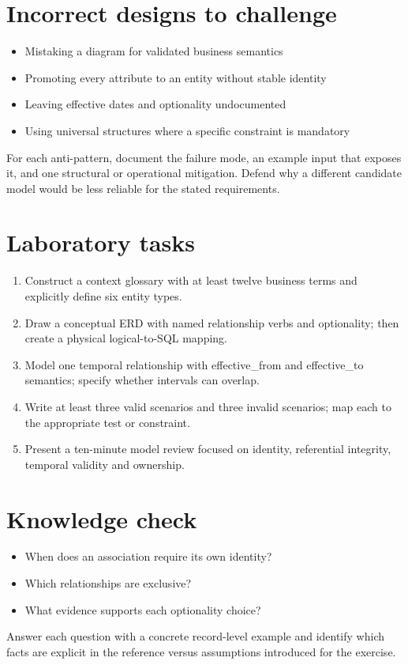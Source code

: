 \documentclass[11pt,letterpaper]{article}
\begin{document}
\section{Incorrect designs to challenge}
\begin{itemize}
\item Mistaking a diagram for validated business semantics
\item Promoting every attribute to an entity without stable identity
\item Leaving effective dates and optionality undocumented
\item Using universal structures where a specific constraint is mandatory
\end{itemize}
For each anti-pattern, document the failure mode, an example input that exposes it, and one structural or operational mitigation. Defend why a different candidate model would be less reliable for the stated requirements.


\section{Laboratory tasks}
\begin{enumerate}
\item Construct a context glossary with at least twelve business terms and explicitly define six entity types.
\item Draw a conceptual ERD with named relationship verbs and optionality; then create a physical logical-to-SQL mapping.
\item Model one temporal relationship with effective\_from and effective\_to semantics; specify whether intervals can overlap.
\item Write at least three valid scenarios and three invalid scenarios; map each to the appropriate test or constraint.
\item Present a ten-minute model review focused on identity, referential integrity, temporal validity and ownership.
\end{enumerate}

\section{Knowledge check}
\begin{itemize}
\item When does an association require its own identity?
\item Which relationships are exclusive?
\item What evidence supports each optionality choice?
\end{itemize}
Answer each question with a concrete record-level example and identify which facts are explicit in the reference versus assumptions introduced for the exercise.
\end{document}
